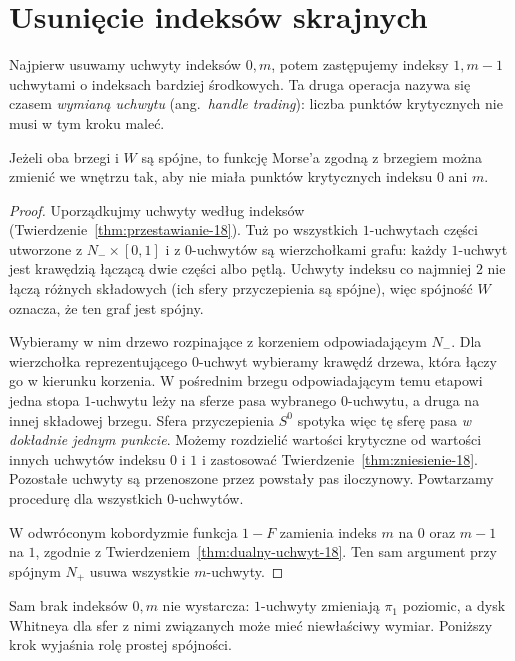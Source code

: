 \section{Usunięcie indeksów skrajnych}
\label{sec:skrajne-hc-19}

Najpierw usuwamy uchwyty indeksów
$0,m$, potem zastępujemy indeksy
$1,m-1$ uchwytami o indeksach
bardziej środkowych. Ta druga
operacja nazywa się czasem
\emph{wymianą uchwytu}
(ang.\ \emph{handle trading}):
liczba punktów krytycznych
nie musi w tym kroku maleć.

\begin{lemat}
\label{lem:zero-m-hc-19}
Jeżeli oba brzegi i $W$ są spójne,
to funkcję Morse'a zgodną z brzegiem
można zmienić we wnętrzu tak, aby
nie miała punktów krytycznych
indeksu $0$ ani $m$.
\end{lemat}
\begin{proof}
Uporządkujmy uchwyty według indeksów
(Twierdzenie~\ref{thm:przestawianie-18}).
Tuż po wszystkich $1$-uchwytach
części utworzone z $N_-\times[0,1]$
i z $0$-uchwytów są wierzchołkami
grafu: każdy $1$-uchwyt jest krawędzią
łączącą dwie części albo pętlą.
Uchwyty indeksu co najmniej $2$
nie łączą różnych składowych
(ich sfery przyczepienia są spójne),
więc spójność $W$ oznacza,
że ten graf jest spójny.

Wybieramy w nim drzewo rozpinające
z korzeniem odpowiadającym $N_-$.
Dla wierzchołka reprezentującego
$0$-uchwyt wybieramy krawędź drzewa,
która łączy go w kierunku korzenia.
W pośrednim brzegu odpowiadającym
temu etapowi jedna stopa
$1$-uchwytu leży na sferze pasa
wybranego $0$-uchwytu, a druga
na innej składowej brzegu.
Sfera przyczepienia $S^0$
spotyka więc tę sferę pasa
\emph{w dokładnie jednym punkcie}.
Możemy rozdzielić wartości
krytyczne od wartości innych
uchwytów indeksu $0$ i $1$
i zastosować
Twierdzenie~\ref{thm:zniesienie-18}.
Pozostałe uchwyty są przenoszone
przez powstały pas iloczynowy.
Powtarzamy procedurę dla
wszystkich $0$-uchwytów.

W odwróconym kobordyzmie
funkcja $1-F$ zamienia indeks $m$
na $0$ oraz $m-1$ na $1$,
zgodnie z
Twierdzeniem~\ref{thm:dualny-uchwyt-18}.
Ten sam argument przy spójnym
$N_+$ usuwa wszystkie $m$-uchwyty.
\end{proof}

Sam brak indeksów $0,m$
nie wystarcza: $1$-uchwyty
zmieniają $\pi_1$ poziomic,
a dysk Whitneya dla sfer
z nimi związanych może mieć
niewłaściwy wymiar. Poniższy
krok wyjaśnia rolę prostej
spójności.


